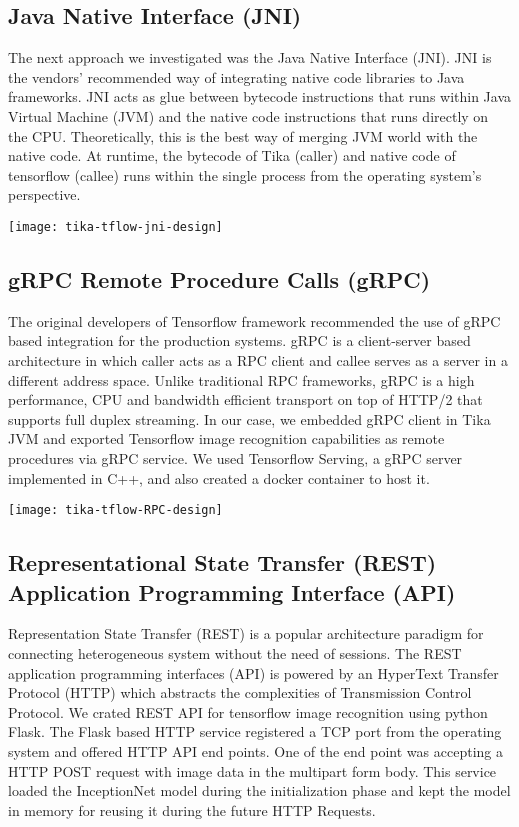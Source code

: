 \subsection{Java Native Interface (JNI)} \label{sec:int-jni}
The next approach we investigated was the Java Native Interface (JNI). JNI is the vendors' recommended way of integrating native code libraries to Java frameworks\cite{}. JNI acts as glue between bytecode instructions that runs within Java Virtual Machine (JVM) and the native  code instructions that runs directly on the CPU. Theoretically, this is the best way of merging JVM world with the native code\cite{}. At runtime, the bytecode of Tika (caller) and native code of tensorflow (callee) runs within the single process from the operating system's perspective.

\texttt{[image: tika-tflow-jni-design]}

\subsection{gRPC Remote Procedure Calls (gRPC)} \label{sec:int-rpc}
The original developers of Tensorflow framework recommended the use of gRPC based integration for the production systems\cite{}. gRPC is a client-server based architecture in which caller acts as a RPC client and callee serves as a server in a different address space. Unlike traditional RPC frameworks, gRPC is a high performance, CPU and bandwidth efficient transport on top of HTTP/2 that supports full duplex streaming\cite{}. In our case, we embedded gRPC client in Tika JVM and exported Tensorflow image recognition capabilities as remote procedures via gRPC service. We used Tensorflow Serving\cite{}, a gRPC\cite{} server implemented in C++, and also created a docker container to host it.

\texttt{[image: tika-tflow-RPC-design]}

\subsection{Representational State Transfer (REST) Application Programming Interface (API)} \label{sec:int-rest}
Representation State Transfer (REST) is a popular architecture paradigm for connecting heterogeneous system without the need of sessions\cite{}. The REST application programming interfaces (API) is powered by an HyperText Transfer Protocol (HTTP) which abstracts the complexities of Transmission Control Protocol.
We crated REST API for tensorflow image recognition using python Flask\cite{}. The Flask based HTTP service registered a TCP port from the operating system and offered HTTP API end points.
One of the end point was accepting a HTTP POST request with image data in the multipart form \cite{} body. This service loaded the InceptionNet \cite{} model during the initialization phase and kept the model in memory for reusing it during the future HTTP Requests.

